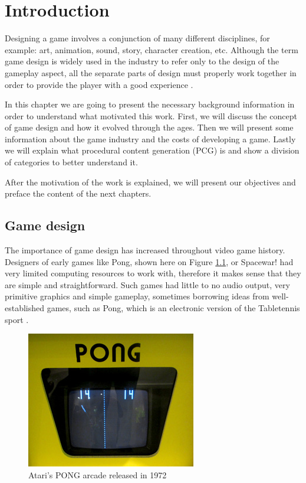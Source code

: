 \chapter{Introduction} %
\label{chapter:intro}

Designing a game involves a conjunction of many different disciplines, for example: art, animation, sound, story, character creation, etc. Although the term game design is widely used in the industry to refer only to the design of the gameplay aspect, all the separate parts of design must properly work together in order to provide the player with a good experience \cite{zubek:2020}.

In this chapter we are going to present the necessary background information in order to understand what motivated this work. First, we will discuss the concept of game design and how it evolved through the ages. Then we will present some information about the game industry and the costs of developing a game. Lastly we will explain what procedural content generation (PCG) is and show a division of categories to better understand it.

After the motivation of the work is explained, we will present our objectives and preface the content of the next chapters. 

\section{Game design}

The importance of game design has increased throughout video game history. Designers of early games like Pong, shown here on Figure \ref{fig:pong}, or Spacewar! had very limited computing resources to work with, therefore it makes sense that they are simple and straightforward. Such games had little to no audio output, very primitive graphics and simple gameplay, sometimes borrowing ideas from well-established games, such as Pong, which is an electronic version of the Tabletennis sport \cite{wolf:2007}.

\begin{figure}[h]
    \caption{Atari's PONG arcade released in 1972}
    \centerline{\includegraphics{images/introduction/PongScreenAtariOriginal.jpeg}}
    \label{fig:pong}
\end{figure}

